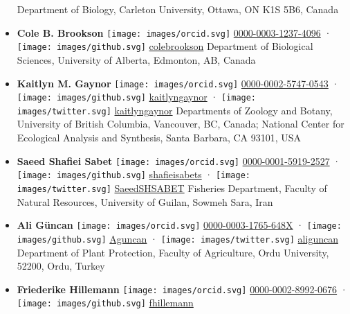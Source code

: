 \begin{itemize}
  Department of Biology, Carleton University, Ottawa, ON K1S 5B6, Canada
\item
  \textbf{Cole B. Brookson}
  \texttt{[image: images/orcid.svg]}
  \href{https://orcid.org/0000-0003-1237-4096}{0000-0003-1237-4096}
  · \texttt{[image: images/github.svg]}
  \href{https://github.com/colebrookson}{colebrookson}
  Department of Biological Sciences, University of Alberta, Edmonton, AB, Canada
\item
  \textbf{Kaitlyn M. Gaynor}
  \texttt{[image: images/orcid.svg]}
  \href{https://orcid.org/0000-0002-5747-0543}{0000-0002-5747-0543}
  · \texttt{[image: images/github.svg]}
  \href{https://github.com/kaitlyngaynor}{kaitlyngaynor}
  · \texttt{[image: images/twitter.svg]}
  \href{https://twitter.com/kaitlyngaynor}{kaitlyngaynor}
  Departments of Zoology and Botany, University of British Columbia, Vancouver, BC, Canada; National Center for Ecological Analysis and Synthesis, Santa Barbara, CA 93101, USA
\item
  \textbf{Saeed Shafiei Sabet}
  \texttt{[image: images/orcid.svg]}
  \href{https://orcid.org/0000-0001-5919-2527}{0000-0001-5919-2527}
  · \texttt{[image: images/github.svg]}
  \href{https://github.com/shafieisabets}{shafieisabets}
  · \texttt{[image: images/twitter.svg]}
  \href{https://twitter.com/SaeedSHSABET}{SaeedSHSABET}
  Fisheries Department, Faculty of Natural Resources, University of Guilan, Sowmeh Sara, Iran
\item
  \textbf{Ali Güncan}
  \texttt{[image: images/orcid.svg]}
  \href{https://orcid.org/0000-0003-1765-648X}{0000-0003-1765-648X}
  · \texttt{[image: images/github.svg]}
  \href{https://github.com/Aguncan}{Aguncan}
  · \texttt{[image: images/twitter.svg]}
  \href{https://twitter.com/aliguncan}{aliguncan}
  Department of Plant Protection, Faculty of Agriculture, Ordu University, 52200, Ordu, Turkey
\item
  \textbf{Friederike Hillemann}
  \texttt{[image: images/orcid.svg]}
  \href{https://orcid.org/0000-0002-8992-0676}{0000-0002-8992-0676}
  · \texttt{[image: images/github.svg]}
  \href{https://github.com/fhillemann}{fhillemann}

\end{itemize}
